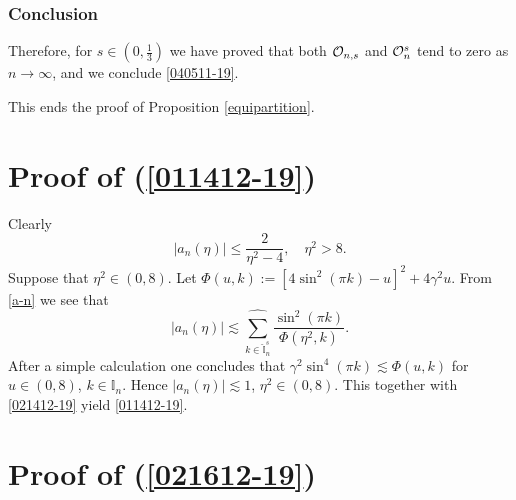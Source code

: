 \documentclass[EJP]{ejpecp} %
\newcommand\T{{\mathbb I}}
\newcommand \ga{\gamma}
\renewcommand{\le}{\leqslant}
\renewcommand{\hat}{\widehat}
\numberwithin{equation}{section}
\begin{document}
\subsubsection{Conclusion} Therefore, for $s \in (0,\frac13)$ we have proved that both ${\cal O}_{n,s}$ and ${\cal O}_n^s$
{tend to zero} as $n\to\infty$, and we conclude \eqref{040511-19}.

 This ends the proof of Proposition \ref{equipartition}.


\appendix


\section{Proof of (\ref{011412-19})}
\label{sec:app1}

Clearly
\begin{equation}
\label{021412-19}
|a_n(\eta)|\le \frac{2}{\eta^2-4},\quad \eta^2>8.
\end{equation}
Suppose that $\eta^2\in(0,8)$. 
Let $\Phi(u,k):=[4\sin^2(\pi  k)-u]^2+4\ga^2 u$. From \eqref{a-n} we see
that 
$$
|a_n(\eta)|\lesssim \underset{{k\in \widehat{\T}_n^s}}{{\hat\sum}}\frac{\sin^2(\pi k)}{\Phi(\eta^2,k)}.
$$ 
After a simple calculation one concludes that 
$
\ga^2\sin^4(\pi
  k)\lesssim \Phi(u,k)$ for $u\in(0,8)$, $k\in\T_n$.
Hence $|a_n(\eta)|\lesssim 1$, $\eta^2\in(0,8)$. This together with \eqref{021412-19} yield \eqref{011412-19}.








\section{Proof of (\ref{021612-19})}

\label{sec:app2}
\end{document}
